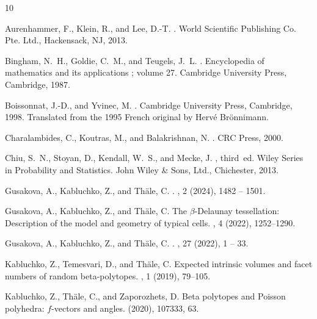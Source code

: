 \documentclass[11pt,a4paper]{article}
\theoremstyle{plain}
\theoremstyle{definition}
\theoremstyle{remark}
\begin{document}
\begin{thebibliography}{10}

{\sc Aurenhammer, F., Klein, R., and Lee, D.-T.}
.
\newblock World Scientific Publishing Co. Pte. Ltd., Hackensack, NJ, 2013.

{\sc Bingham, N.~H., Goldie, C.~M., and Teugels, J.~L.}
.
\newblock Encyclopedia of mathematics and its applications ; volume 27.
    Cambridge University Press, Cambridge, 1987.

{\sc Boissonnat, J.-D., and Yvinec, M.}
.
\newblock Cambridge University Press, Cambridge, 1998.
\newblock Translated from the 1995 French original by Herv\'{e} Br\"{o}nnimann.

{\sc Charalambides, C., Koutras, M., and Balakrishnan, N.}
.
\newblock CRC Press, 2000.

{\sc Chiu, S.~N., Stoyan, D., Kendall, W.~S., and Mecke, J.}
, third~ed.
\newblock Wiley Series in Probability and Statistics. John Wiley \& Sons, Ltd.,
    Chichester, 2013.

{\sc Gusakova, A., Kabluchko, Z., and Th{\"a}le, C.}
.
, 2 (2024), 1482 -- 1501.

{\sc Gusakova, A., Kabluchko, Z., and Th\"{a}le, C.}
\newblock The {$\beta$}-{D}elaunay tessellation: {D}escription of the model and
    geometry of typical cells.
, 4 (2022), 1252--1290.

{\sc Gusakova, A., Kabluchko, Z., and Thäle, C.}
.
, 27 (2022), 1 -- 33.

{\sc Kabluchko, Z., Temesvari, D., and Th\"{a}le, C.}
\newblock Expected intrinsic volumes and facet numbers of random
    beta-polytopes.
, 1 (2019), 79--105.

{\sc Kabluchko, Z., Th\"{a}le, C., and Zaporozhets, D.}
\newblock Beta polytopes and {P}oisson polyhedra: {$f$}-vectors and angles.
 (2020), 107333, 63.


\end{thebibliography}
\end{document}
